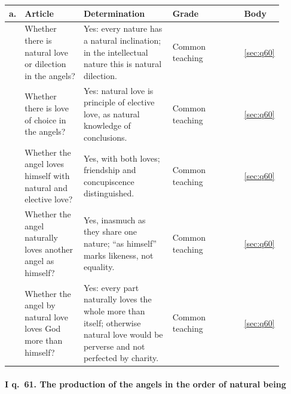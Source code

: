 \begingroup\footnotesize
\begin{longtable}{>{\raggedright\arraybackslash}p{0.03\linewidth}>{\raggedright\arraybackslash}p{0.22\linewidth}>{\raggedright\arraybackslash}p{0.33\linewidth}>{\raggedright\arraybackslash}p{0.27\linewidth}>{\raggedright\arraybackslash}p{0.06\linewidth}}
\toprule
\textbf{a.} & \textbf{Article} & \textbf{Determination} & \textbf{Grade} & \textbf{Body}\\
\midrule
\endhead
1 & Whether there is natural love or dilection in the angels? & Yes: every nature has a natural inclination; in the intellectual nature this is natural dilection. & Common teaching & \ref{sec:q60}\\
2 & Whether there is love of choice in the angels? & Yes: natural love is principle of elective love, as natural knowledge of conclusions. & Common teaching & \ref{sec:q60}\\
3 & Whether the angel loves himself with natural and elective love? & Yes, with both loves; friendship and concupiscence distinguished. & Common teaching & \ref{sec:q60}\\
4 & Whether the angel naturally loves another angel as himself? & Yes, inasmuch as they share one nature; ``as himself'' marks likeness, not equality. & Common teaching & \ref{sec:q60}\\
5 & Whether the angel by natural love loves God more than himself? & Yes: every part naturally loves the whole more than itself; otherwise natural love would be perverse and not perfected by charity. & Common teaching & \ref{sec:q60}\\
\bottomrule
\end{longtable}
\endgroup

\paragraph{I q.~61. The production of the angels in the order of natural being}

